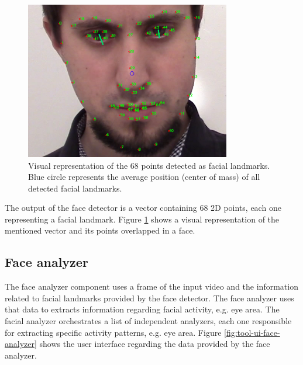 \begin{figure}
    \centering
    \includegraphics[width=0.8\textwidth]{Content/figures/tool-ui-face-detector.png}
    \caption{Visual representation of the 68 points detected as facial landmarks. Blue circle represents the average position (center of mass) of all detected facial landmarks.}
    \label{fig:tool-ui-face-detector}
\end{figure}

The output of the face detector is a vector containing 68 2D points, each one representing a facial landmark. Figure \ref{fig:tool-ui-face-detector} shows a visual representation of the mentioned vector and its points overlapped in a face.

\subsection{Face analyzer}

The face analyzer component uses a frame of the input video and the information related to facial landmarks provided by the face detector. The face analyzer uses that data to extracts information regarding facial activity, e.g. eye area. The facial analyzer orchestrates a list of independent analyzers, each one responsible for extracting specific activity patterns, e.g. eye area. Figure \ref{fig:tool-ui-face-analyzer} shows the user interface regarding the data provided by the face analyzer.

